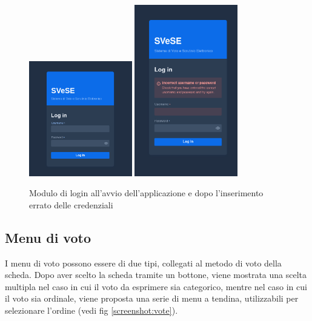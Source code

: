 \begin{figure}
	\centering
	\includegraphics[width=0.4\textwidth]{img/gui/login.png}
	\includegraphics[width=0.4\textwidth]{img/gui/loginError.png}
	\caption{Modulo di login all'avvio dell'applicazione e dopo l'inserimento errato delle credenziali}
	\label{screenshot:login}
\end{figure}

\subsection{Menu di voto}
I menu di voto possono essere di due tipi, collegati al metodo di voto della scheda. Dopo aver scelto la scheda tramite un bottone, viene mostrata una scelta multipla nel caso in cui il voto da esprimere sia categorico, mentre nel caso in cui il voto sia ordinale, viene proposta una serie di menu a tendina, utilizzabili per selezionare l'ordine (vedi fig \ref{screenshot:vote}).

